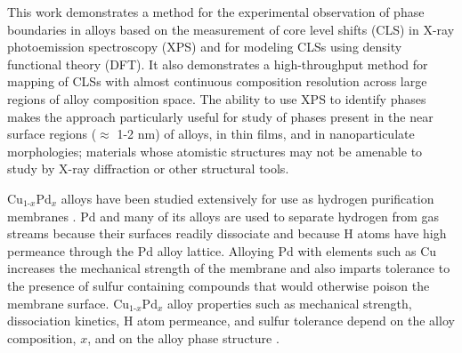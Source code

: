 \documentclass[number, sort&compress, review, 12pt]{elsarticle}
\begin{document}
This work demonstrates a method for the experimental observation of phase boundaries in alloys based on the measurement of core level shifts (CLS) in X-ray photoemission spectroscopy (XPS) and for modeling CLSs using density functional theory (DFT). It also demonstrates a high-throughput method for mapping of CLSs with almost continuous composition resolution across large regions of alloy composition space. The ability to use XPS to identify phases makes the approach particularly useful for study of phases present in the near surface regions ($\approx$ 1-2 nm) of alloys, in thin films, and in nanoparticulate morphologies; materials whose atomistic structures may not be amenable to study by X-ray diffraction or other structural tools.

Cu$_{\text{1-}x}$Pd$_x$ alloys have been studied extensively for use as hydrogen purification membranes \cite{paglieri-2002-innov-in,kulprathipanja-2005-pd-pd,morreale-2007-exper-comput,miller-2008-surfac-segreg,obrien-2010-inhib-hydrog,peters-2011-devel-thin,martin-2013-measur-hydrog}. Pd and many of its alloys are used to separate hydrogen from gas streams because their surfaces readily dissociate  and because H atoms have high permeance through the Pd alloy lattice. Alloying Pd with elements such as Cu increases the mechanical strength of the membrane and also imparts tolerance to the presence of sulfur containing compounds that would otherwise poison the membrane surface. Cu$_{\text{1-}x}$Pd$_x$ alloy properties such as mechanical strength,  dissociation kinetics, H atom permeance, and sulfur tolerance depend on the alloy composition, $x$, and on the alloy phase structure \cite{kulprathipanja-2005-pd-pd,obrien-2010-inhib-hydrog,obrien-2011-kinet-h,obrien-2012-h-d,martin-2013-measur-hydrog}.
\end{document}
